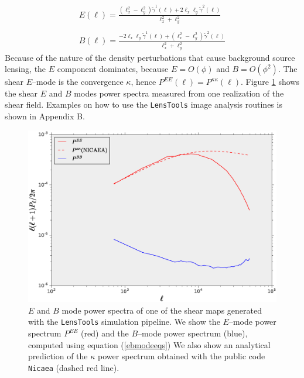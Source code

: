 \documentclass[reprint,aps,prd,superscriptaddress,showkeys,showpacs]{revtex4-1}
\newcommand{\ttt}[1]{\texttt{#1}}
\newcommand{\LT}{\texttt{LensTools} }
\begin{document}
\begin{equation}
\label{ebmodeeqs}
\begin{matrix}
E(\pmb{\ell}) = \frac{(\ell_x^2-\ell_y^2)\tilde{\gamma}^1(\pmb{\ell})+2\ell_x\ell_y\tilde{\gamma}^2(\pmb{\ell})}{\ell_x^2+\ell_y^2}  \\ \\
B(\pmb{\ell}) = \frac{-2\ell_x\ell_y\tilde{\gamma}^1(\pmb{\ell})+(\ell_x^2-\ell_y^2)\tilde{\gamma}^2(\pmb{\ell})}{\ell_x^2+\ell_y^2}
\end{matrix}
\end{equation}
%
Because of the nature of the density perturbations that cause background source lensing, the $E$ component dominates, because $E=O(\phi)$ and $B=O(\phi^2)$. The shear $E$--mode is the convergence $\kappa$, hence $P^{EE}(\ell)=P^{\kappa\kappa}(\ell)$. Figure \ref{ebmodefig} shows the shear $E$ and $B$ modes power spectra measured from one realization of the shear field. Examples on how to use the \LT image analysis routines is shown in Appendix B.   

\begin{figure}
\includegraphics[scale=0.3]{Figures/eb_modes.eps}
\caption{$E$ and $B$ mode power spectra of one of the shear maps generated with the \LT simulation pipeline. We show the $E$--mode power spectrum $P^{EE}$ (red) and the $B$--mode power spectrum (blue), computed using equation (\ref{ebmodeeqs}) We also show an analytical prediction of the $\kappa$ power spectrum obtained with the public code \ttt{Nicaea} (dashed red line).}
\label{ebmodefig}
\end{figure}


\end{document}
